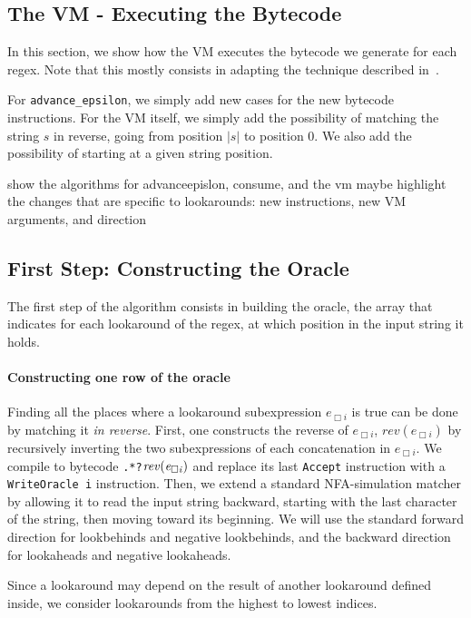 \documentclass{article}
\renewcommand\cite\citep
\def\bytecode#1{\lstinline[style=byt]{#1}}
\def\regex#1{\lstinline[style=rgx]{#1}}
\def\todo#1{{\color{ACMOrange}{TODO: }}#1}
\def\size#1{\ensuremath{|#1|}}
\begin{document}
\subsection{The VM - Executing the Bytecode}

In this section, we show how the VM executes the bytecode we generate for each regex.
Note that this mostly consists in adapting the technique described in~\cite{regex_vm_approach}.

For \texttt{advance\_epsilon}, we simply add new cases for the new bytecode instructions.
For the VM itself, we simply add the possibility of matching the string $s$ in reverse, going from position $\size{s}$ to position 0.
We also add the possibility of starting at a given string position.

\todo{show the algorithms for advanceepislon, consume, and the vm}
\todo{maybe highlight the changes that are specific to lookarounds: new instructions, new VM arguments, and direction}

\subsection{First Step: Constructing the Oracle}

The first step of the algorithm consists in building the oracle, the array that indicates for each lookaround of the regex, at which position in the input string it holds.

\paragraph{Constructing one row of the oracle}
Finding all the places where a lookaround subexpression $e_{\Box i}$ is true can be done by matching it \textit{in reverse}.
First, one constructs the reverse of $e_{\Box i}$, $\mathit{rev}(e_{\Box i})$ by recursively inverting the two subexpressions of each concatenation in $e_{\Box i}$.
We compile to bytecode \regex{.*?}$\mathit{rev(\mathit{e}_{\Box i})}$ and replace its last \bytecode{Accept} instruction with a \bytecode{WriteOracle i} instruction.
Then, we extend a standard NFA-simulation matcher by allowing it to read the input string backward, starting with the last character of the string, then moving toward its beginning.
We will use the standard forward direction for lookbehinds and negative lookbehinds, and the backward direction for lookaheads and negative lookaheads.

Since a lookaround may depend on the result of another lookaround defined inside, we consider lookarounds from the highest to lowest indices.
\end{document}

